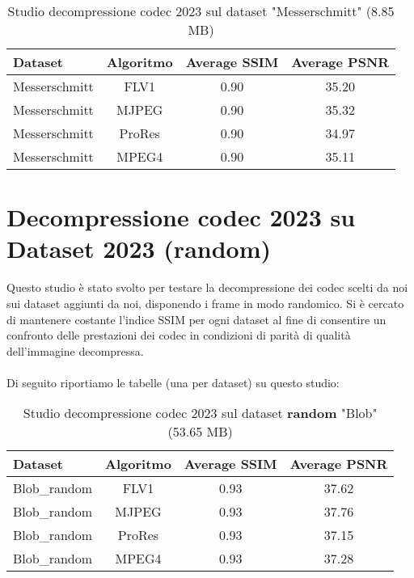 \begin{table}[ht!]
\centering
\begin{tabular}{|l|c|c|c|}
\hline
Dataset               & Algoritmo & Average SSIM & Average PSNR \\ \hline
Messerschmitt         & FLV1      & 0.90        & 35.20       \\ \hline
Messerschmitt         & MJPEG     & 0.90        & 35.32       \\ \hline
Messerschmitt         & ProRes    & 0.90        & 34.97       \\ \hline
Messerschmitt         & MPEG4     & 0.90        & 35.11       \\ \hline
\end{tabular}
\caption{Studio decompressione codec 2023 sul dataset "Messerschmitt" (8.85 MB)}
\end{table}

\clearpage
\section{Decompressione codec 2023 su Dataset 2023 (random)}
Questo studio è stato svolto per testare la decompressione dei codec scelti da noi sui dataset aggiunti da noi, disponendo i frame in modo randomico. Si è cercato di mantenere costante l'indice SSIM per ogni dataset al fine di consentire un confronto delle prestazioni dei codec in condizioni di parità di qualità dell'immagine decompressa.
\\
\\
Di seguito riportiamo le tabelle (una per dataset) su questo studio:

\begin{table}[!ht]
\centering
\begin{tabular}{|l|c|c|c|}
\hline
Dataset               & Algoritmo & Average SSIM & Average PSNR \\ \hline
Blob\_random          & FLV1      & 0.93        & 37.62       \\ \hline
Blob\_random          & MJPEG     & 0.93        & 37.76       \\ \hline
Blob\_random          & ProRes    & 0.93        & 37.15       \\ \hline
Blob\_random          & MPEG4     & 0.93        & 37.28       \\ \hline
\end{tabular}
\caption{Studio decompressione codec 2023 sul dataset \textbf{random} "Blob" (53.65 MB)}
\end{table}

